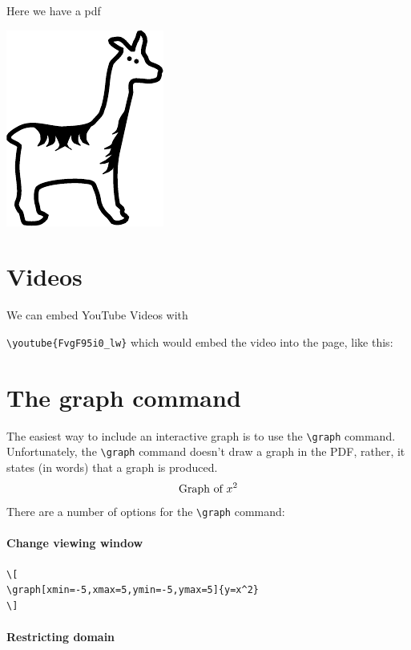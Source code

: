\documentclass{ximera}
\begin{document}
Here we have a pdf
\begin{center}
  \includegraphics{llama.pdf}
\end{center}


\section{Videos}

We can embed YouTube Videos with 




\verb|\youtube{FvgF95i0_lw}| which would embed the video into the page, like this:
\begin{center}
\end{center}



\section{The graph command}

The easiest way to include an interactive graph is to use the
\verb|\graph| command. Unfortunately, the \verb|\graph| command
doesn't draw a graph in the PDF, rather, it states (in words) that a
graph is produced.
\[
\text{Graph of $x^2$}
\]
There are a number of options for the \verb|\graph| command:


\paragraph{Change viewing window}
\begin{verbatim}
\[
\graph[xmin=-5,xmax=5,ymin=-5,ymax=5]{y=x^2}
\]
\end{verbatim}



\paragraph{Restricting domain}
\end{document}
